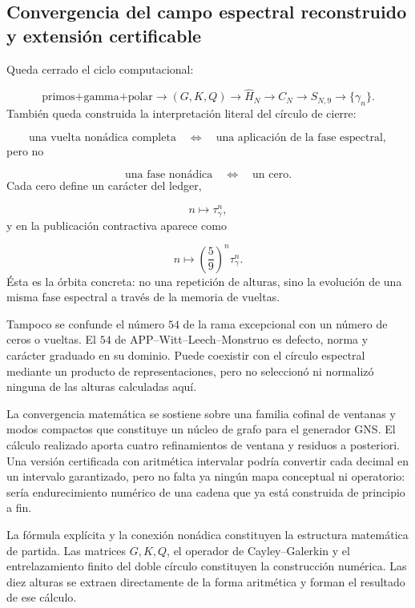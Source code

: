 \subsection{Convergencia del campo espectral reconstruido y extensión certificable}
Queda cerrado el ciclo computacional:\par
\[
\text{primos+gamma+polar}
\longrightarrow
(G,K,Q)
\longrightarrow
\widehat H_N
\longrightarrow
C_N
\longrightarrow
S_{N,9}
\longrightarrow
\{\gamma_n\}.
\]
También queda construida la interpretación literal del círculo de cierre:\par
\[
\text{una vuelta nonádica completa}
\quad\Longleftrightarrow\quad
\text{una aplicación de la fase espectral},
\]
pero no\par
\[
\text{una fase nonádica}
\quad\Longleftrightarrow\quad
\text{un cero}.
\]
Cada cero define un carácter del ledger,\par
\[
n\longmapsto\tau_\gamma^n,
\]
y en la publicación contractiva aparece como\par
\[
n\longmapsto
\left(\frac59\right)^n\tau_\gamma^n.
\]
Ésta es la órbita concreta: no una repetición de alturas, sino la evolución de una misma fase espectral a través de la memoria de vueltas.\par
Tampoco se confunde el número \(54\) de la rama excepcional con un número de ceros o vueltas. El \(54\) de APP–Witt–Leech–Monstruo es defecto, norma y carácter graduado en su dominio. Puede coexistir con el círculo espectral mediante un producto de representaciones, pero no seleccionó ni normalizó ninguna de las alturas calculadas aquí.\par
La convergencia matemática se sostiene sobre una familia cofinal de ventanas y modos compactos que constituye un núcleo de grafo para el generador GNS. El cálculo realizado aporta cuatro refinamientos de ventana y residuos a posteriori. Una versión certificada con aritmética intervalar podría convertir cada decimal en un intervalo garantizado, pero no falta ya ningún mapa conceptual ni operatorio: sería endurecimiento numérico de una cadena que ya está construida de principio a fin.\par
La fórmula explícita y la conexión nonádica constituyen la estructura matemática de partida. Las matrices \(G,K,Q\), el operador de Cayley–Galerkin y el entrelazamiento finito del doble círculo constituyen la construcción numérica. Las diez alturas se extraen directamente de la forma aritmética y forman el resultado de ese cálculo.\par
